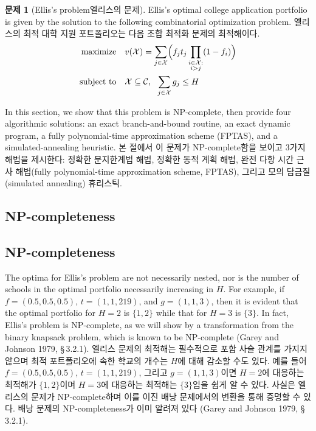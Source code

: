\documentclass[11pt]{article} %
\theoremstyle{definition}
\newtheorem{problem}{Problem}
\theoremstyle{definition}
\newtheorem{problem}{문제}
\begin{document}
\begin{problem}[\ifen Ellis's problem\else 엘리스의 문제\fi]
\ifen
Ellis's optimal college application portfolio is given by the solution to the following combinatorial optimization problem.
\else 
엘리스의 최적 대학 지원 포트폴리오는 다음 조합 최적화 문제의 최적해이다.
\fi
\begin{align}
\begin{split}
\text{maximize}\quad &  v(\mathcal{X}) = \sum_{j\in
\mathcal{X}} \Bigl(f_j t_j \prod_{\substack{i \in \mathcal{X}: \\ i > j}} (1 - f_{i}) \Bigr)\\
\text{subject to}\quad & \mathcal{X}\subseteq\mathcal{C},~~\sum_{j \in \mathcal{X}} g_j \leq H 
\end{split}
\end{align}
\end{problem}

\ifen
\noindent In this section, we show that this problem is NP-complete, then provide four algorithmic solutions: an exact branch-and-bound routine, an exact dynamic program, a fully polynomial-time approximation scheme (FPTAS), and a simulated-annealing heuristic. 
\else
\noindent 본 절에서 이 문제가 NP-complete함을 보이고 3가지 해법을 제시한다: 정확한 분지한계법 해법, 정확한 동적 계획 해법, 완전 다항 시간 근사 해법(fully polynomial-time approximation scheme, FPTAS), 그리고 모의 담금질(simulated annealing) 휴리스틱.
\fi

\ifen \subsection{NP-completeness} \else \subsection{NP-completeness}\fi
\ifen
The optima for Ellis's problem are not necessarily nested, nor is the number of schools in the optimal portfolio necessarily increasing in $H$. For example, if
$f = (0.5, 0.5, 0.5)$, $t = (1, 1, 219)$, and $g = (1, 1, 3)$,
then it is evident that the optimal portfolio for $H = 2$ is $\{1, 2\}$ while that for $H = 3$ is $\{3\}$. In fact, Ellis’s problem is NP-complete, as we will show by a transformation from the binary knapsack problem, which is known to be NP-complete (Garey and Johnson 1979, \S\,3.2.1).
\else
엘리스 문제의 최적해는 필수적으로 포함 사슬 관계를 가지지 않으며 최적 포트폴리오에 속한 학교의 개수는 $H$에 대해 감소할 수도 있다. 예를 들어
$f = (0.5, 0.5, 0.5)$, $t = (1, 1, 219)$, 그리고 $g = (1, 1, 3)$이면 $H = 2$에 대응하는 최적해가 $\{1, 2\}$이며 $H = 3$에 대응하는 최적해는 $\{3\}$임을 쉽게 알 수 있다. 사실은 엘리스의 문제가 NP-complete하며 이를 이진 배낭 문제에서의 변환을 통해 증명할 수 있다. 배낭 문제의 NP-completeness가 이미 알려져 있다 (Garey and Johnson 1979, \S\,3.2.1).
\fi
\end{document}
